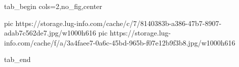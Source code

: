  
 
 
 
 


\ifcmt
  tab_begin cols=2,no_fig,center

     pic https://storage.lug-info.com/cache/c/7/8140383b-a386-47b7-8907-adab7c562de7.jpg/w1000h616
		 pic https://storage.lug-info.com/cache/f/a/3a4faee7-0a6c-45bd-965b-f07e12b9f3b8.jpg/w1000h616

  tab_end
\fi
